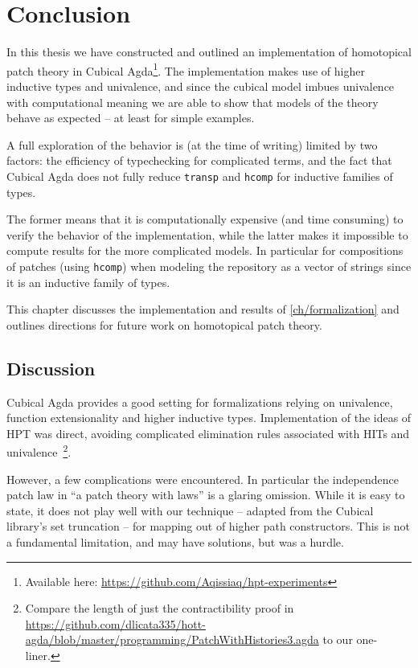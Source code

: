 \chapter{Conclusion}\label{ch/conclusion}

In this thesis we have constructed and outlined an implementation of homotopical
patch theory in Cubical Agda\footnote{Available here:
  \url{https://github.com/Aqissiaq/hpt-experiments}}.
The implementation makes use of higher inductive
types and univalence, and since the cubical model imbues univalence with
computational meaning we are able to show that models of the theory behave as
expected -- at least for simple examples.

A full exploration of the behavior is (at the time of writing) limited by two
factors: the efficiency of typechecking for complicated terms, and the fact that
Cubical Agda does not fully reduce \texttt{transp} and \texttt{hcomp} for
inductive families of types.

The former means that it is computationally expensive (and time consuming) to
verify the behavior of the implementation, while the latter makes it impossible
to compute results for the more complicated models. In particular for
compositions of patches (using \texttt{hcomp}) when modeling the repository as a
vector of strings since it is an inductive family of types.

This chapter discusses the implementation and results of
\autoref{ch/formalization} and outlines directions for future work on homotopical
patch theory.

\section{Discussion}
Cubical Agda provides a good setting for formalizations relying on univalence,
function extensionality and higher inductive types. Implementation of the
ideas of HPT was direct, avoiding complicated elimination rules associated with
HITs and univalence~\footnote{Compare the length of just the contractibility
proof in \url{https://github.com/dlicata335/hott-agda/blob/master/programming/PatchWithHistories3.agda}
to our one-liner.}.

However, a few complications were encountered. In particular the independence
patch law in ``a patch theory with laws'' is a glaring omission. While it is
easy to state, it does not play well with our technique -- adapted from the Cubical library's set
truncation -- for mapping out of higher path constructors. This is not a
fundamental limitation, and may have solutions, but was a hurdle.

